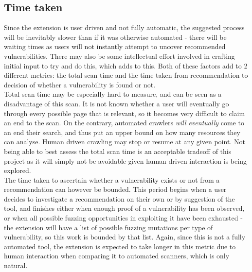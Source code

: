 \subsection{Time taken}
Since the extension is user driven and not fully automatic, the suggested process will be inevitably slower than if it was otherwise automated - there will be waiting times as users will not instantly attempt to uncover recommended vulnerabilities. There may also be some intellectual effort involved in crafting initial input to try and do this, which adds to this. Both of these factors add to 2 different metrics: the total scan time and the time taken from recommendation to decision of whether a vulnerability is found or not. \\

Total scan time may be especially hard to measure, and can be seen as a disadvantage of this scan. It is not known whether a user will eventually go through every possible page that is relevant, so it becomes very difficult to claim an end to the scan. On the contrary, automated crawlers \emph{will eventually} come to an end their search, and thus put an upper bound on how many resources they can analyse. Human driven crawling may stop or resume at any given point. Not being able to best assess the total scan time is an acceptable tradeoff of this project as it will simply not be avoidable given human driven interaction is being explored. \\

The time taken to ascertain whether a vulnerability exists or not from a recommendation can however be bounded. This period begins when a user decides to investigate a recommendation on their own or by suggestion of the tool, and finishes either when enough proof of a vulnerability has been observed, or when all possible fuzzing opportunities in exploiting it have been exhausted - the extension will have a list of possible fuzzing mutations per type of vulnerability, so this work is bounded by that list. Again, since this is not a fully automated tool, the extension is expected to take longer in this metric due to human interaction when comparing it to automated scanners, which is only natural. \\

